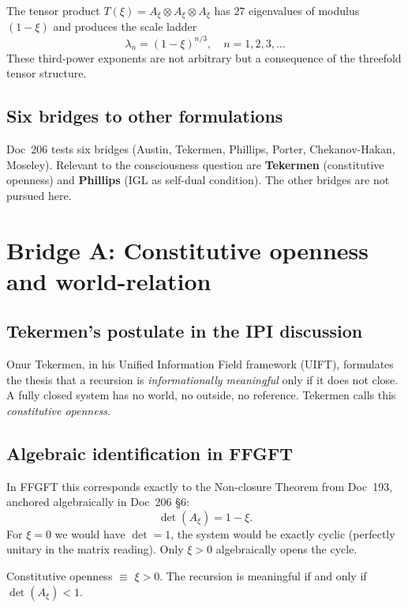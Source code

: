The tensor product $T(\xi) = A_\xi \otimes A_\xi \otimes A_\xi$ has $27$ eigenvalues of modulus $(1-\xi)$ and produces the scale ladder
\[
\lambda_n = (1-\xi)^{n/3}, \quad n = 1, 2, 3, \dots
\]
These third-power exponents are not arbitrary but a consequence of the threefold tensor structure.

\subsection{Six bridges to other formulations}

Doc~206 tests six bridges (Austin, Tekermen, Phillips, Porter, Chekanov-Hakan, Moseley). Relevant to the consciousness question are \textbf{Tekermen} (constitutive openness) and \textbf{Phillips} (IGL as self-dual condition). The other bridges are not pursued here.

\section{Bridge A: Constitutive openness and world-relation}\label{sec:bridgeA}

\subsection{Tekermen's postulate in the IPI discussion}

Onur Tekermen, in his Unified Information Field framework (UIFT), formulates the thesis that a recursion is \emph{informationally meaningful} only if it does not close. A fully closed system has no world, no outside, no reference. Tekermen calls this \emph{constitutive openness}.

\subsection{Algebraic identification in FFGFT}

In FFGFT this corresponds exactly to the Non-closure Theorem from Doc~193, anchored algebraically in Doc~206 \S6:
\begin{equation}
\det(A_\xi) = 1 - \xi.
\end{equation}
For $\xi = 0$ we would have $\det = 1$, the system would be exactly cyclic (perfectly unitary in the matrix reading). Only $\xi > 0$ algebraically opens the cycle.

\begin{insightBox}
Constitutive openness $\equiv$ $\xi > 0$. The recursion is meaningful if and only if $\det(A_\xi) < 1$.
\end{insightBox}


